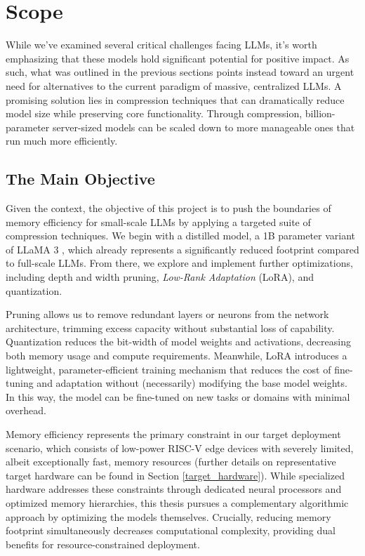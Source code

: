 \section{Scope}
While we've examined several critical challenges facing LLMs, it's worth emphasizing that these models hold significant potential for positive impact. As such, what was outlined in the previous sections points instead toward an urgent need for alternatives to the current paradigm of massive, centralized LLMs. A promising solution lies in compression techniques that can dramatically reduce model size while preserving core functionality. Through compression, billion-parameter server-sized models can be scaled down to more manageable ones that run much more efficiently.

\subsection{The Main Objective}
Given the context, the objective of this project is to push the boundaries of memory efficiency for small-scale LLMs by applying a targeted suite of compression techniques. We begin with a distilled model, a 1B parameter variant of LLaMA 3 \cite{llama3_1b}, which already represents a significantly reduced footprint compared to full-scale LLMs. From there, we explore and implement further optimizations, including depth and width pruning, \textit{Low-Rank Adaptation} (LoRA), and quantization.

Pruning allows us to remove redundant layers or neurons from the network architecture, trimming excess capacity without substantial loss of capability. Quantization reduces the bit-width of model weights and activations, decreasing both memory usage and compute requirements. Meanwhile, LoRA introduces a lightweight, parameter-efficient training mechanism that reduces the cost of fine-tuning and adaptation without (necessarily) modifying the base model weights. In this way, the model can be fine-tuned on new tasks or domains with minimal overhead.

Memory efficiency represents the primary constraint in our target deployment scenario, which consists of low-power RISC-V edge devices with severely limited, albeit exceptionally fast, memory resources (further details on representative target hardware can be found in Section \ref{target_hardware}). While specialized hardware addresses these constraints through dedicated neural processors and optimized memory hierarchies, this thesis pursues a complementary algorithmic approach by optimizing the models themselves. Crucially, reducing memory footprint simultaneously decreases computational complexity, providing dual benefits for resource-constrained deployment.

